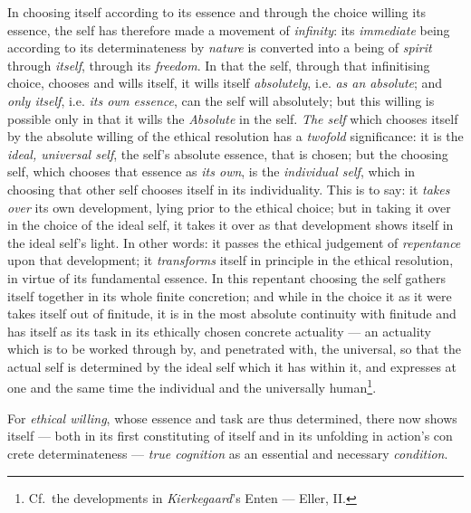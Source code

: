 \documentclass[12pt,a4paper]{book}
\begin{document}
In choosing itself according to its essence and through the choice willing its
essence, the self has therefore made a movement of \emph{infinity}: its
\emph{immediate} being according to its determinateness by \emph{nature} is
converted into a being of \emph{spirit} through \emph{itself}, through its
\emph{freedom}.
In that the self, through that infinitising choice, chooses and wills itself,
it wills itself \emph{absolutely}, i.e. \emph{as an absolute}; and \emph{only
itself}, i.e. \emph{its own essence}, can the self will absolutely; but this
willing is possible only in that it wills the \emph{Absolute} in the self.
\emph{The self} which chooses itself by the absolute willing of the ethical
resolution has a \emph{twofold} significance: it is the \emph{ideal, universal
self}, the self's absolute essence, that is chosen; but the choosing self,
which chooses that essence as \emph{its own}, is the \emph{individual self},
which in choosing that other self chooses itself in its individuality. This is
to say: it \emph{takes over} its own development, lying prior to the ethical
choice; but in taking it over in the choice of the ideal self, it takes it
over as that development shows itself in the ideal self's light. In other
words: it passes the ethical judgement of \emph{repentance} upon that
development; it \emph{transforms} itself in principle in the ethical
resolution, in virtue of its fundamental essence. In this repentant choosing
the self gathers itself together in its whole finite concretion; and while in
the choice it as it were takes itself out of finitude, it is in the most
absolute continuity with finitude and has itself as its task in its ethically
chosen concrete actuality --- an actuality which is to be worked through by,
and penetrated with, the universal, so that the actual self is determined by
the ideal self which it has within it, and expresses at one and the same time
the individual and the universally human\footnote{Cf.\ the developments in
\emph{Kierkegaard}'s Enten --- Eller, II.}.

For \emph{ethical willing}, whose essence and task are thus determined, there
now shows itself --- both in its first constituting of itself and in its
unfolding in action's con\-%
crete determinateness --- \emph{true cognition} as an essential and necessary
\emph{condition}.
\end{document}
